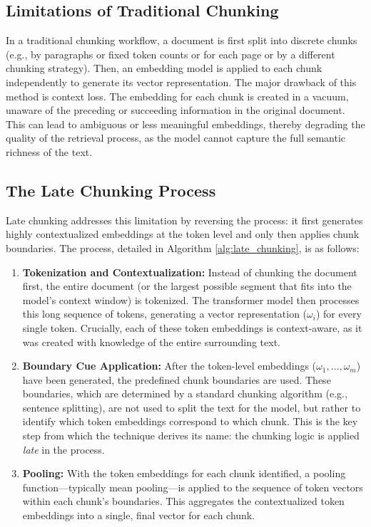 \subsection{Limitations of Traditional Chunking}
In a traditional chunking workflow, a document is first split into discrete chunks (e.g., by paragraphs or fixed token counts or for each page or by a different chunking strategy). Then, an embedding model is applied to each chunk independently to generate its vector representation. The major drawback of this method is context loss. The embedding for each chunk is created in a vacuum, unaware of the preceding or succeeding information in the original document. This can lead to ambiguous or less meaningful embeddings, thereby degrading the quality of the retrieval process, as the model cannot capture the full semantic richness of the text.

\subsection{The Late Chunking Process}
Late chunking addresses this limitation by reversing the process: it first generates highly contextualized embeddings at the token level and only then applies chunk boundaries. The process, detailed in Algorithm \ref{alg:late_chunking}, is as follows:

\begin{enumerate}
    \item \textbf{Tokenization and Contextualization:} Instead of chunking the document first, the entire document (or the largest possible segment that fits into the model's context window) is tokenized. The transformer model then processes this long sequence of tokens, generating a vector representation ($\omega_i$) for every single token. Crucially, each of these token embeddings is context-aware, as it was created with knowledge of the entire surrounding text.

    \item \textbf{Boundary Cue Application:} After the token-level embeddings ($\omega_1, \dots, \omega_m$) have been generated, the predefined chunk boundaries are used. These boundaries, which are determined by a standard chunking algorithm (e.g., sentence splitting), are not used to split the text for the model, but rather to identify which token embeddings correspond to which chunk. This is the key step from which the technique derives its name: the chunking logic is applied \textit{late} in the process.

    \item \textbf{Pooling:} With the token embeddings for each chunk identified, a pooling function—typically mean pooling—is applied to the sequence of token vectors within each chunk's boundaries. This aggregates the contextualized token embeddings into a single, final vector for each chunk.
\end{enumerate}

